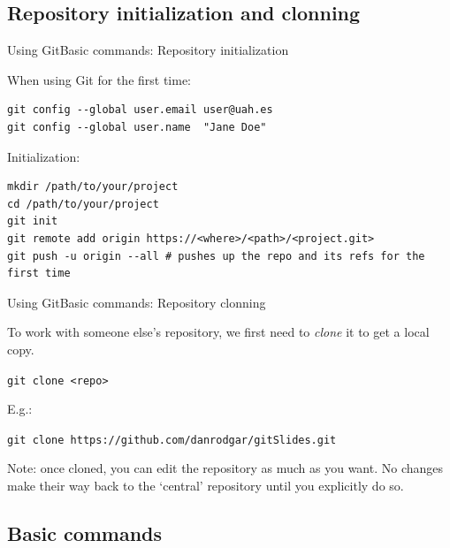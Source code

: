 \documentclass[10pt,compress]{beamer} %
\begin{document}
\subsection{Repository initialization and clonning}


\begin{frame}[fragile]{Using Git}{Basic commands: Repository initialization}

When using Git for the first time:

\begin{verbatim}
git config --global user.email user@uah.es
git config --global user.name  "Jane Doe"
\end{verbatim}

Initialization:

\begin{verbatim}
mkdir /path/to/your/project
cd /path/to/your/project
git init
git remote add origin https://<where>/<path>/<project.git>
git push -u origin --all # pushes up the repo and its refs for the first time
\end{verbatim}

\end{frame}

\begin{frame}{Using Git}{Basic commands: Repository clonning}

To work with someone else’s repository, we first need to \emph{clone} it to get a
local copy.

\texttt{git clone <repo>}

E.g.:

\texttt{git clone https://github.com/danrodgar/gitSlides.git}

\begin{footnotesize}Note: once cloned, you can edit the repository as much as you want. No changes make their way back to the ‘central’ repository until you explicitly do so.
\end{footnotesize}
\end{frame}


\subsection{Basic commands}
\end{document}
